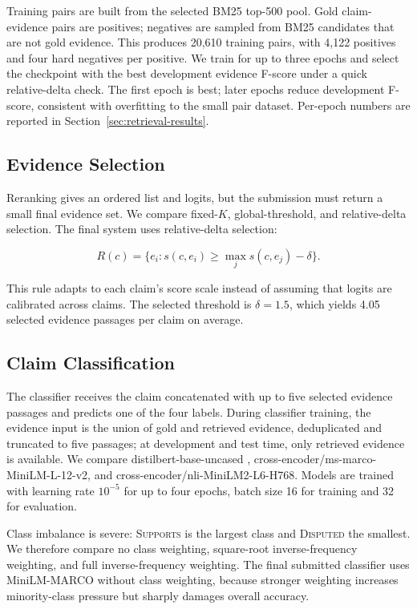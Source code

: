 \documentclass[11pt]{article}
\begin{document}
Training pairs are built from the selected BM25 top-500 pool. Gold claim-evidence pairs are positives; negatives are sampled from BM25 candidates that are not gold evidence. This produces 20,610 training pairs, with 4,122 positives and four hard negatives per positive. We train for up to three epochs and select the checkpoint with the best development evidence F-score under a quick relative-delta check. The first epoch is best; later epochs reduce development F-score, consistent with overfitting to the small pair dataset. Per-epoch numbers are reported in Section~\ref{sec:retrieval-results}.

\subsection{Evidence Selection}

Reranking gives an ordered list and logits, but the submission must return a small final evidence set. We compare fixed-$K$, global-threshold, and relative-delta selection. The final system uses relative-delta selection:

\begin{equation}
  R(c) = \{e_i: s(c,e_i) \geq \max_j s(c,e_j) - \delta\}.
  \label{eq:relative-delta}
\end{equation}

This rule adapts to each claim's score scale instead of assuming that logits are calibrated across claims. The selected threshold is $\delta=1.5$, which yields 4.05 selected evidence passages per claim on average.

\subsection{Claim Classification}

The classifier receives the claim concatenated with up to five selected evidence passages and predicts one of the four labels. During classifier training, the evidence input is the union of gold and retrieved evidence, deduplicated and truncated to five passages; at development and test time, only retrieved evidence is available. We compare distilbert-base-uncased \citep{sanh2019distilbert}, cross-encoder/ms-marco-MiniLM-L-12-v2, and cross-encoder/nli-MiniLM2-L6-H768. Models are trained with learning rate $10^{-5}$ for up to four epochs, batch size 16 for training and 32 for evaluation.

Class imbalance is severe: \textsc{Supports} is the largest class and \textsc{Disputed} the smallest. We therefore compare no class weighting, square-root inverse-frequency weighting, and full inverse-frequency weighting. The final submitted classifier uses MiniLM-MARCO without class weighting, because stronger weighting increases minority-class pressure but sharply damages overall accuracy.
\end{document}
